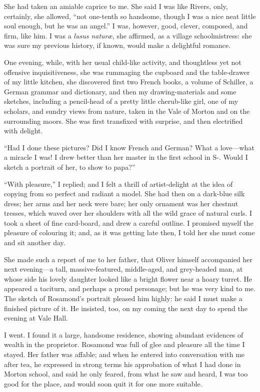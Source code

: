 She had taken an amiable caprice to me. She said I was like \Mr{} Rivers,
only, certainly, she allowed, \enquote{not one-tenth so handsome, though
	I was a nice neat little soul enough, but he was an angel.} I was,
however, good, clever, composed, and firm, like him. I was a
\emph{lusus naturæ}, she affirmed, as a village schoolmistress: she was
sure my previous history, if known, would make a delightful romance.

One evening, while, with her usual child-like activity, and thoughtless
yet not offensive inquisitiveness, she was rummaging the cupboard and
the table-drawer of my little kitchen, she discovered first two French
books, a volume of Schiller, a German grammar and dictionary, and then
my drawing-materials and some sketches, including a pencil-head of a
pretty little cherub-like girl, one of my scholars, and sundry views
from nature, taken in the Vale of Morton and on the surrounding moors.
She was first transfixed with surprise, and then electrified with
delight.

\enquote{Had I done these pictures? Did I know French and German? What
	a love---what a miracle I was! I drew better than her master in the
	first school in S-. Would I sketch a portrait of her, to show to papa?}

\enquote{With pleasure,} I replied; and I felt a thrill of
artist-delight at the idea of copying from so perfect and radiant a
model. She had then on a dark-blue silk dress; her arms and her neck
were bare; her only ornament was her chestnut tresses, which waved over
her shoulders with all the wild grace of natural curls. I took a sheet
of fine card-board, and drew a careful outline. I promised myself the
pleasure of colouring it; and, as it was getting late then, I told her
she must come and sit another day.

She made such a report of me to her father, that \Mr{} Oliver himself
accompanied her next evening---a tall, massive-featured, middle-aged,
and grey-headed man, at whose side his lovely daughter looked like a
bright flower near a hoary turret. He appeared a taciturn, and perhaps
a proud personage; but he was very kind to me. The sketch of Rosamond's
portrait pleased him highly: he said I must make a finished picture of
it. He insisted, too, on my coming the next day to spend the evening at
Vale Hall.

I went. I found it a large, handsome residence, showing abundant
evidences of wealth in the proprietor. Rosamond was full of glee and
pleasure all the time I stayed. Her father was affable; and when he
entered into conversation with me after tea, he expressed in strong
terms his approbation of what I had done in Morton school, and said he
only feared, from what he saw and heard, I was too good for the place,
and would soon quit it for one more suitable.

